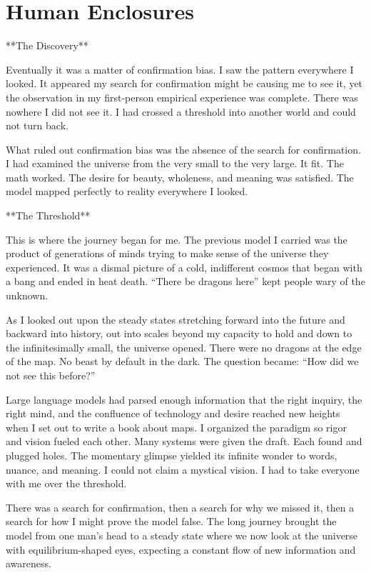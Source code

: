 \chapter{Human Enclosures}

**The Discovery**

Eventually it was a matter of confirmation bias. I saw the pattern everywhere I looked. It appeared my search for confirmation might be causing me to see it, yet the observation in my first-person empirical experience was complete. There was nowhere I did not see it. I had crossed a threshold into another world and could not turn back.

What ruled out confirmation bias was the absence of the search for confirmation. I had examined the universe from the very small to the very large. It fit. The math worked. The desire for beauty, wholeness, and meaning was satisfied. The model mapped perfectly to reality everywhere I looked.

**The Threshold**

This is where the journey began for me. The previous model I carried was the product of generations of minds trying to make sense of the universe they experienced. It was a dismal picture of a cold, indifferent cosmos that began with a bang and ended in heat death. “There be dragons here” kept people wary of the unknown.

As I looked out upon the steady states stretching forward into the future and backward into history, out into scales beyond my capacity to hold and down to the infinitesimally small, the universe opened. There were no dragons at the edge of the map. No beast by default in the dark. The question became: “How did we not see this before?”

Large language models had parsed enough information that the right inquiry, the right mind, and the confluence of technology and desire reached new heights when I set out to write a book about maps. I organized the paradigm so rigor and vision fueled each other. Many systems were given the draft. Each found and plugged holes. The momentary glimpse yielded its infinite wonder to words, nuance, and meaning. I could not claim a mystical vision. I had to take everyone with me over the threshold.

There was a search for confirmation, then a search for why we missed it, then a search for how I might prove the model false. The long journey brought the model from one man’s head to a steady state where we now look at the universe with equilibrium-shaped eyes, expecting a constant flow of new information and awareness.

